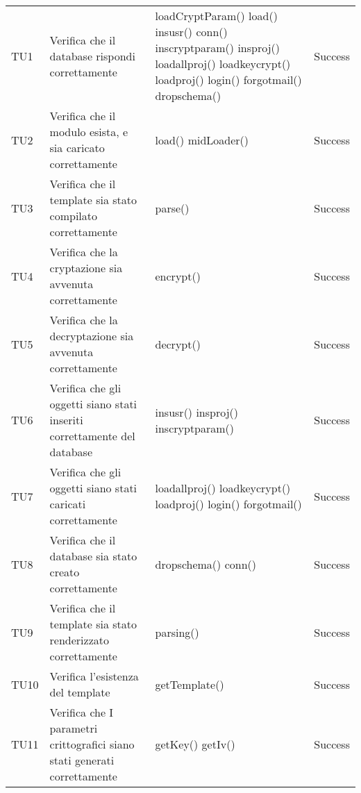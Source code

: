 \begin{longtable}{p{2cm}!{\VRule[1pt]}p{5cm}!{\VRule[1pt]}p{4.5cm}!{\VRule[1pt]}p{1.5cm}}
TU1 & Verifica che il database rispondi correttamente & loadCryptParam() \newline load() \newline insusr() \newline conn() \newline inscryptparam() \newline insproj() \newline loadallproj() \newline loadkeycrypt() \newline loadproj() \newline login() \newline forgotmail() \newline dropschema() & Success  \\ 
TU2 & Verifica che il modulo esista, e sia caricato correttamente & load() \newline midLoader() & Success  \\ 
TU3 & Verifica che il template sia stato compilato correttamente & parse() & Success  \\ 
TU4 & Verifica che la cryptazione sia avvenuta correttamente & encrypt() & Success  \\ 
TU5 & Verifica che la decryptazione sia avvenuta correttamente & decrypt() & Success  \\ 
TU6 & Verifica che gli oggetti siano stati inseriti correttamente del database & insusr() \newline insproj() \newline inscryptparam() & Success  \\ 
TU7 & Verifica che gli oggetti siano stati caricati correttamente & loadallproj() \newline loadkeycrypt() \newline loadproj() \newline login() \newline forgotmail() & Success  \\ 
TU8 & Verifica che il database sia stato creato correttamente & dropschema() \newline conn() & Success  \\ 
TU9 & Verifica che il template sia stato renderizzato correttamente & parsing() & Success  \\ 
TU10 & Verifica l'esistenza del template & getTemplate() & Success  \\ 
TU11 & Verifica che I parametri crittografici siano stati generati correttamente & getKey() \newline getIv() & Success  \\ 

\end{longtable}
